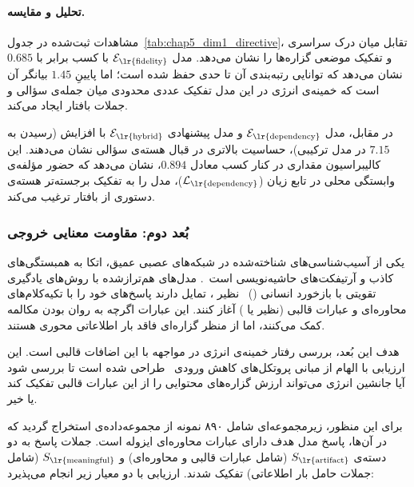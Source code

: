 \paragraph{تحلیل و مقایسه.}
مشاهدات ثبت‌شده در جدول~\ref{tab:chap5_dim1_directive}، تقابل میان درک سراسری و تفکیک موضعی گزاره‌ها را نشان می‌دهد. مدل $\mathcal{E}_{\text{\lr{fidelity}}}$ با کسب  برابر با $0.685$ نشان می‌دهد که توانایی رتبه‌بندی آن تا حدی حفظ شده است؛ اما  پایینِ $1.45$ بیانگر آن است که خمینه‌ی انرژی در این مدل تفکیک عددی محدودی میان جمله‌ی سؤالی و جملات بافتار ایجاد می‌کند. 

در مقابل، مدل $\mathcal{E}_{\text{\lr{dependency}}}$ و مدل پیشنهادی $\mathcal{E}_{\text{\lr{hybrid}}}$ با افزایش  (رسیدن به $7.15$ در مدل ترکیبی)، حساسیت بالاتری در قبال هسته‌ی سؤالی نشان می‌دهند. این کالیبراسیون مقداری در کنار کسب  معادل $0.894$، نشان می‌دهد که حضور مؤلفه‌ی وابستگی محلی در تابع زیان ($\mathcal{L}_{\text{\lr{dependency}}}$)، مدل را به تفکیک برجسته‌تر هسته‌ی دستوری از بافتار ترغیب می‌کند.


\subsubsection{بُعد دوم: مقاومت معنایی خروجی}\label{sec:5-2-2-2}

یکی از آسیب‌شناسی‌های شناخته‌شده در شبکه‌های عصبی عمیق، اتکا به همبستگی‌های کاذب و آرتیفکت‌های حاشیه‌نویسی است~\cite{gururangan2018annotation}. مدل‌های هم‌ترازشده با روش‌های یادگیری تقویتی با بازخورد انسانی ()~\cite{ouyang2022training} نظیر ، تمایل دارند پاسخ‌های خود را با تکیه‌کلام‌های محاوره‌ای و عبارات قالبی (نظیر  یا ) آغاز کنند. این عبارات اگرچه به روان بودن مکالمه کمک می‌کنند، اما از منظر گزاره‌ای فاقد بار اطلاعاتی محوری هستند. %

هدف این بُعد، بررسی رفتار خمینه‌ی انرژی در مواجهه با این اضافات قالبی است. این ارزیابی با الهام از مبانی پروتکل‌های کاهش ورودی~\cite{feng2018pathologies} طراحی شده است تا بررسی شود آیا جانشین انرژی می‌تواند ارزش گزاره‌های محتوایی را از این عبارات قالبی تفکیک کند یا خیر.

برای این منظور، زیرمجموعه‌ای شامل ۸۹۰ نمونه از مجموعه‌داده‌ی  استخراج گردید که در آن‌ها، پاسخ مدل هدف دارای عبارات محاوره‌ای ایزوله است. جملات پاسخ به دو دسته‌ی $S_{\text{\lr{artifact}}}$ (شامل عبارات قالبی و محاوره‌ای) و $S_{\text{\lr{meaningful}}}$ (شامل جملات حامل بار اطلاعاتی) تفکیک شدند. ارزیابی با دو معیار زیر انجام می‌پذیرد:

